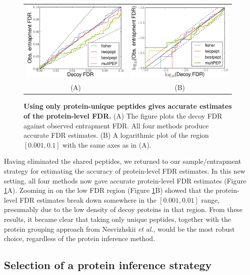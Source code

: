 \documentclass{article}
\begin{document}
\begin{figure}
\begin{center}
\begin{tabular}{cc} 
\includegraphics[width=0.45\linewidth]{./img/unique-pept-accuracy} &
\includegraphics[width=0.45\linewidth]{./img/unique-pept-accuracy-log}\\
(A) & (B)
\end{tabular}
\caption{\label{fig:unique-accuracy}\textbf{Using only protein-unique
    peptides gives accurate estimates of the protein-level FDR.}
  (A) The figure plots the decoy FDR against observed entrapment FDR. 
  All four methods produce accurate FDR estimates. (B) A logarithmic 
  plot of the region $[0.001, 0.1]$ with the same axes as in (A).}
\end{center}
\end{figure}

Having eliminated the shared peptides, we returned to our
sample/entrapment strategy for estimating the accuracy of
protein-level FDR estimates.  In this new setting, all four methods
now gave accurate protein-level FDR estimates (Figure
\ref{fig:unique-accuracy}A).  Zooming in on the low FDR region (Figure
\ref{fig:unique-accuracy}B) showed that the protein-level FDR
estimates break down somewhere in the $[0.001, 0.01]$ range,
presumably due to the low density of decoy proteins in that region.
From these results, it became clear that taking only unique peptides,
together with the protein grouping approach from Nesvizhskii {\em et
  al.}, would be the most robust choice, regardless of the protein
inference method.

\subsection*{Selection of a protein inference strategy}
\end{document}

